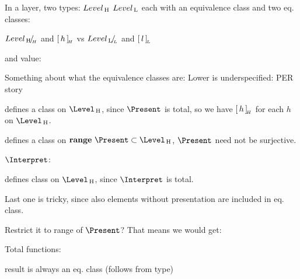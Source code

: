 

In a layer, two types: $Level_{\, \mathrm H}$ $Level_{\, \mathrm L}$ each with an equivalence class and two eq. classes:

${Level_{\, \mathrm H}}\!/_{{_{\!\!{H}}}}$ and $[\,{h}\,]_{{\!_{H}}}$ vs ${Level_{\, \mathrm L}}\!/_{{_{\!\!{L}}}}$ and $[\,{l}\,]_{{\!_{L}}}$ 

and value:

Something about what the equivalence classes are: Lower is underspecified: 
PER story

\textdownarrow\textdownarrow\textdownarrow\textdownarrow


defines a class on $\Level\H$, since $\Present$ is total, so we have $[\,{h}\,]_{{\!_{H}}}$ for each $h$ on $\Level\H$.

defines a class on ${\bf range}~\Present \subset \Level\H$, $\Present$ need not be surjective.

$\Interpret$:


defines class on $\Level\H$, since $\Interpret$ is total.

Last one is tricky, since also elements without presentation are included in eq. class.

Restrict it to range of $\Present$?
That means we would get:


\textuparrow\textuparrow\textuparrow\textuparrow

Total functions:


result is always an eq. class (follows from type)



